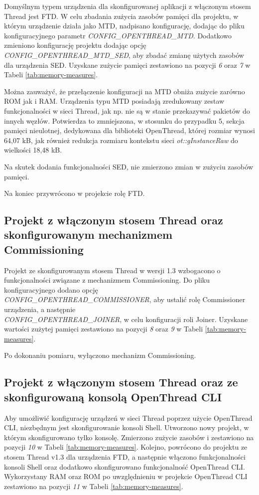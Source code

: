     Domyślnym typem urządzenia dla skonfigurowanej aplikacji z włączonym stosem Thread jest FTD. W celu zbadania zużycia zasobów pamięci dla projektu, w którym urządzenie działa jako MTD, nadpisano konfigurację, dodając do pliku konfiguracyjnego parametr \textit{CONFIG\_OPENTHREAD\_MTD}. Dodatkowo zmieniono konfigurację projektu dodając opcję \textit{CONFIG\_OPENTHREAD\_MTD\_SED}, aby zbadać zmianę użytych zasobów dla urządzenia SED. Uzyskane zużycie pamięci zestawiono na pozycji \textit{6} oraz \textit{7} w Tabeli \ref{tab:memory-measures}.

    Można zauważyć, że przełączenie konfiguracji na MTD obniża zużycie zarówno ROM jak i RAM. Urządzenia typu MTD posiadają zredukowany zestaw funkcjonalności w sieci Thread, jak np. nie są w stanie przekazywać pakietów do innych węzłów. Potwierdza to zmniejszona, w stosunku do przypadku 5, sekcja pamięci nieulotnej, dedykowana dla biblioteki OpenThread, której rozmiar wynosi 64,07 kB, jak również redukcja rozmiaru kontekstu sieci \textit{ot::gInstanceRaw} do wielkości 18,48 kB.

    Na skutek dodania funkcjonalności SED, nie zmierzono zmian w zużyciu zasobów pamięci.

    Na koniec przywrócono w projekcie rolę FTD.

    \subsection{Projekt z włączonym stosem Thread oraz skonfigurowanym mechanizmem Commissioning}
    Projekt ze skonfigurowanym stosem Thread w wersji 1.3 wzbogacono o funkcjonalności związane z mechanizmem Commissioning. Do pliku konfiguracyjnego dodano opcję \\\textit{CONFIG\_OPENTHREAD\_COMMISSIONER}, aby ustalić rolę Commissioner urządzenia, a następnie \\\textit{CONFIG\_OPENTHREAD\_JOINER}, w celu konfiguracji roli Joiner. Uzyskane wartości zużytej pamięci zestawiono na pozycji \textit{8} oraz \textit{9} w Tabeli \ref{tab:memory-measures}.
    
    Po dokonaniu pomiaru, wyłączono mechanizm Commissioning.

    \subsection{Projekt z włączonym stosem Thread oraz ze skonfigurowaną konsolą OpenThread CLI}

    Aby umożliwić konfigurację urządzeń w sieci Thread poprzez użycie OpenThread CLI, niezbędnym jest skonfigurowanie konsoli Shell. Utworzono nowy projekt, w którym skonfigurowano tylko konsolę. Zmierzono zużycie zasobów i zestawiono na pozycji \textit{10} w Tabeli \ref{tab:memory-measures}. Kolejno, powrócono do projektu ze stosem Thread v1.3 dla urządzenia FTD, a następnie włączono funkcjonalności konsoli Shell oraz dodatkowo skonfigurowano funkcjonalność OpenThread CLI. Wykorzystany RAM oraz ROM po uwzględnieniu w projekcie OpenThread CLI zestawiono na pozycji \textit{11} w Tabeli \ref{tab:memory-measures}.
        
